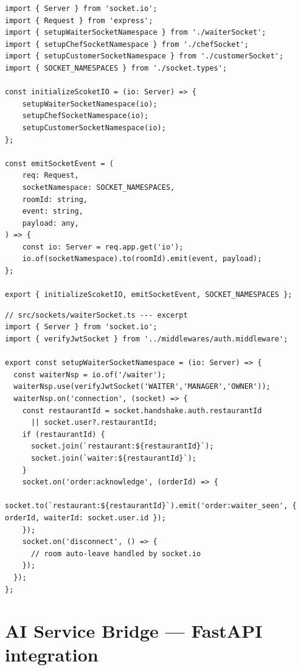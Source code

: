 \begin{lstlisting}[caption={Socket.IO initialization --- multi-namespace, room-based tenant isolation --- \texttt{src/sockets/index.ts}},label=lst:socket]
import { Server } from 'socket.io';
import { Request } from 'express';
import { setupWaiterSocketNamespace } from './waiterSocket';
import { setupChefSocketNamespace } from './chefSocket';
import { setupCustomerSocketNamespace } from './customerSocket';
import { SOCKET_NAMESPACES } from './socket.types';

const initializeScoketIO = (io: Server) => {
    setupWaiterSocketNamespace(io);
    setupChefSocketNamespace(io);
    setupCustomerSocketNamespace(io);
};

const emitSocketEvent = (
    req: Request,
    socketNamespace: SOCKET_NAMESPACES,
    roomId: string,
    event: string,
    payload: any,
) => {
    const io: Server = req.app.get('io');
    io.of(socketNamespace).to(roomId).emit(event, payload);
};

export { initializeScoketIO, emitSocketEvent, SOCKET_NAMESPACES };
\end{lstlisting}

\begin{lstlisting}[caption={Waiter namespace --- JWT auth + restaurant room join},label=lst:waiter_socket]
// src/sockets/waiterSocket.ts --- excerpt
import { Server } from 'socket.io';
import { verifyJwtSocket } from '../middlewares/auth.middleware';

export const setupWaiterSocketNamespace = (io: Server) => {
  const waiterNsp = io.of('/waiter');
  waiterNsp.use(verifyJwtSocket('WAITER','MANAGER','OWNER'));
  waiterNsp.on('connection', (socket) => {
    const restaurantId = socket.handshake.auth.restaurantId 
      || socket.user?.restaurantId;
    if (restaurantId) {
      socket.join(`restaurant:${restaurantId}`);
      socket.join(`waiter:${restaurantId}`);
    }
    socket.on('order:acknowledge', (orderId) => {
      socket.to(`restaurant:${restaurantId}`).emit('order:waiter_seen', { orderId, waiterId: socket.user.id });
    });
    socket.on('disconnect', () => {
      // room auto-leave handled by socket.io
    });
  });
};
\end{lstlisting}

\section{AI Service Bridge --- FastAPI integration}
\label{app:ai_service}

